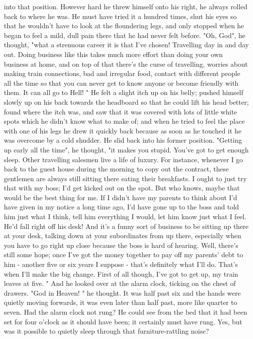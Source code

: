 \documentclass[listoffigures, listoftables]{ifathesis}
\begin{document}
into that position. However hard he threw himself onto his right, he always rolled back to where he was. He must have tried it a hundred times, shut his eyes so that he wouldn't have to look at the floundering legs, and only stopped when he began to feel a mild, dull pain there that he had never felt before. "Oh, God", he thought, "what a strenuous career it is that I've chosen! Travelling day in and day out. Doing business like this takes much more effort than doing your own business at home, and on top of that there's the curse of travelling, worries about making train connections, bad and irregular food, contact with different people all the time so that you can never get to know anyone or become friendly with them. It can all go to Hell! " He felt a slight itch up on his belly; pushed himself slowly up on his back towards the headboard so that he could lift his head better; found where the itch was, and saw that it was covered with lots of little white spots which he didn't know what to make of; and when he tried to feel the place with one of his legs he drew it quickly back because as soon as he touched it he was overcome by a cold shudder. He slid back into his former position. "Getting up early all the time", he thought, "it makes you stupid. You've got to get enough sleep. Other travelling salesmen live a life of luxury. For instance, whenever I go back to the guest house during the morning to copy out the contract, these gentlemen are always still sitting there eating their breakfasts. I ought to just try that with my boss; I'd get kicked out on the spot. But who knows, maybe that would be the best thing for me. If I didn't have my parents to think about I'd have given in my notice a long time ago, I'd have gone up to the boss and told him just what I think, tell him everything I would, let him know just what I feel. He'd fall right off his desk! And it's a funny sort of business to be sitting up there at your desk, talking down at your subordinates from up there, especially when you have to go right up close because the boss is hard of hearing. Well, there's still some hope; once I've got the money together to pay off my parents' debt to him - another five or six years I suppose - that's definitely what I'll do. That's when I'll make the big change. First of all though, I've got to get up, my train leaves at five. " And he looked over at the alarm clock, ticking on the chest of drawers. "God in Heaven! " he thought. It was half past six and the hands were quietly moving forwards, it was even later than half past, more like quarter to seven. Had the alarm clock not rung? He could see from the bed that it had been set for four o'clock as it should have been; it certainly must have rung. Yes, but was it possible to quietly sleep through that furniture-rattling noise?
\end{document}
